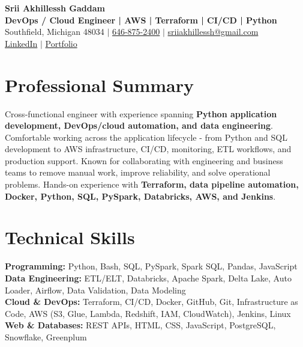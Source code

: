 \documentclass[letterpaper,10pt]{article}
\begin{document}
\fontsize{9.35pt}{10.45pt}\selectfont

\begin{center}
    {\LARGE \textbf{Srii Akhillessh Gaddam}} \\[-1pt]
    \textbf{DevOps / Cloud Engineer | AWS | Terraform | CI/CD | Python} \\[2pt]
    Southfield, Michigan 48034 $|$
    \href{tel:6468752400}{646-875-2400} $|$
    \href{mailto:sriiakhillessh@gmail.com}{sriiakhillessh@gmail.com} \\[1pt]
    \href{https://www.linkedin.com/in/srii-akhiilessh-gaddam-b48668191/}{LinkedIn} $|$
    \href{https://sriiakhillesshg.github.io/portfolio/}{Portfolio}
\end{center}
\vspace{-8pt}

\section{Professional Summary}
\small{Cross-functional engineer with experience spanning \textbf{Python application development, DevOps/cloud automation, and data engineering}. Comfortable working across the application lifecycle - from Python and SQL development to AWS infrastructure, CI/CD, monitoring, ETL workflows, and production support. Known for collaborating with engineering and business teams to remove manual work, improve reliability, and solve operational problems. Hands-on experience with \textbf{Terraform, data pipeline automation, Docker, Python, SQL, PySpark, Databricks, AWS, and Jenkins}.}

\section{Technical Skills}
\small{
\textbf{Programming:} Python, Bash, SQL, PySpark, Spark SQL, Pandas, JavaScript \\
\textbf{Data Engineering:} ETL/ELT, Databricks, Apache Spark, Delta Lake, Auto Loader, Airflow, Data Validation, Data Modeling \\
\textbf{Cloud \& DevOps:} Terraform, CI/CD, Docker, GitHub, Git, Infrastructure as Code, AWS (S3, Glue, Lambda, Redshift, IAM, CloudWatch), Jenkins, Linux \\
\textbf{Web \& Databases:} REST APIs, HTML, CSS, JavaScript, PostgreSQL, Snowflake, Greenplum
}
\end{document}
